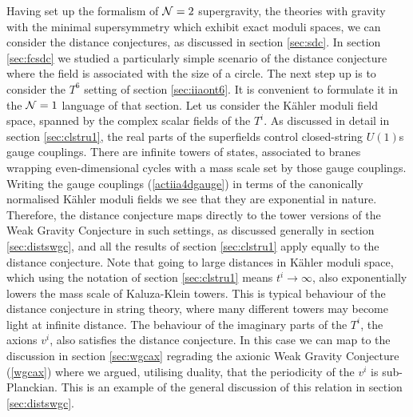 \documentclass[11pt,a4paper]{article}
\numberwithin{equation}{section}
\numberwithin{table}{section}\setlength{\multlinegap}{25pt}
\begin{document}
Having set up the formalism of ${\cal N}=2$ supergravity, the theories with gravity with the minimal supersymmetry which exhibit exact moduli spaces, we can consider the distance conjectures, as discussed in section \ref{sec:sdc}. In section \ref{sec:fcsdc} we studied a particularly simple scenario of the distance conjecture where the field is associated with the size of a circle. The next step up is to consider the $T^6$ setting of section \ref{sec:iiaont6}. It is convenient to formulate it in the ${\cal N}=1$ language of that section. Let us consider the K{\"a}hler moduli field space, spanned by the complex scalar fields of the $T^i$. As discussed in detail in section \ref{sec:clstru1}, the real parts of the superfields control closed-string $U(1)$s gauge couplings. There are infinite towers of states, associated to branes wrapping even-dimensional cycles with a mass scale set by those gauge couplings. Writing the gauge couplings (\ref{actiia4dgauge}) in terms of the canonically normalised K{\"a}hler moduli fields we see that they are exponential in nature. Therefore, the distance conjecture maps directly to the tower versions of the Weak Gravity Conjecture in such settings, as discussed generally in section \ref{sec:distswgc}, and all the results of section \ref{sec:clstru1} apply equally to the distance conjecture. Note that going to large distances in K{\"a}hler moduli space, which using the notation of section \ref{sec:clstru1} means $t^i \rightarrow \infty$, also exponentially lowers the mass scale of Kaluza-Klein towers. This is typical behaviour of the distance conjecture in string theory, where many different towers may become light at infinite distance. The behaviour of the imaginary parts of the $T^i$, the axions $v^i$, also satisfies the distance conjecture. In this case we can map to the discussion in section \ref{sec:wgcax} regrading the axionic Weak Gravity Conjecture (\ref{wgcax}) where we argued, utilising duality, that the periodicity of the $v^i$ is sub-Planckian. This is an example of the general discussion of this relation in section \ref{sec:distswgc}.
\end{document}
